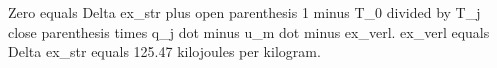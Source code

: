 Zero equals Delta ex_str plus open parenthesis 1 minus T_0 divided by T_j close parenthesis times q_j dot minus u_m dot minus ex_verl.  
ex_verl equals Delta ex_str equals 125.47 kilojoules per kilogram.